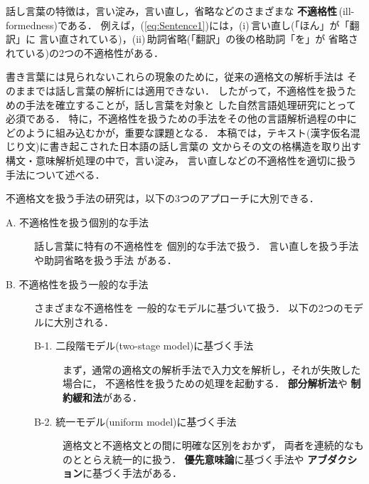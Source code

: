 話し言葉の特徴は，言い淀み，言い直し，省略などのさまざまな
{\bf 不適格性}\,(ill-formedness)である．
例えば，(\ref{eq:Sentence1})には，(i)\,言い直し(「ほん」が「翻訳」に
言い直されている)，(ii)\,助詞省略(「翻訳」の後の格助詞「を」が
省略されている)の2つの不適格性がある．

書き言葉には見られないこれらの現象のために，従来の適格文の解析手法は
そのままでは話し言葉の解析には適用できない．
したがって，不適格性を扱うための手法を確立することが，話し言葉を対象と
した自然言語処理研究にとって必須である．
特に，不適格性を扱うための手法をその他の言語解析過程の中に
どのように組み込むかが，重要な課題となる．
本稿では，テキスト(漢字仮名混じり文)に書き起こされた日本語の話し言葉の
文からその文の格構造を取り出す構文・意味解析処理の中で，言い淀み，
言い直しなどの不適格性を適切に扱う手法について述べる．

不適格文を扱う手法の研究は，以下の3つのアプローチに大別できる．
\begin{description}
  \item[A. 不適格性を扱う個別的な手法] 話し言葉に特有の不適格性を
個別的な手法で扱う．
言い直しを扱う手法\cite{Hindle:ACL83-123,Bear:ACL92-56,
Nakatani:ACL93-46,佐川:情処論-35-1-46}や助詞省略を扱う手法
\cite{山本:情処論-33-11-1322}がある．
  \item[B. 不適格性を扱う一般的な手法] さまざまな不適格性を
一般的なモデルに基づいて扱う．
以下の2つのモデルに大別される．
  \begin{description}
    \item[B-1. 二段階モデル(two-stage model)に基づく手法]
まず，通常の適格文の解析手法で入力文を解析し，それが失敗した場合に，
不適格性を扱うための処理を起動する．
{\bf 部分解析法}\cite{Jensen:CL-9-3-147,McDonald:ANLP92-193}や
{\bf 制約緩和法}\cite{Weischedel:CL-9-3-161,Mellish:ACL89-102}がある．
    \item[B-2. 統一モデル(uniform model)に基づく手法]
適格文と不適格文との間に明確な区別をおかず，
両者を連続的なものととらえ統一的に扱う．
{\bf 優先意味論}に基づく手法\cite{Fass:CL-9-3-178}や
{\bf アブダクション}に基づく手法\cite{Hobbs:AI-63-69}がある．
  \end{description}
\end{description}

